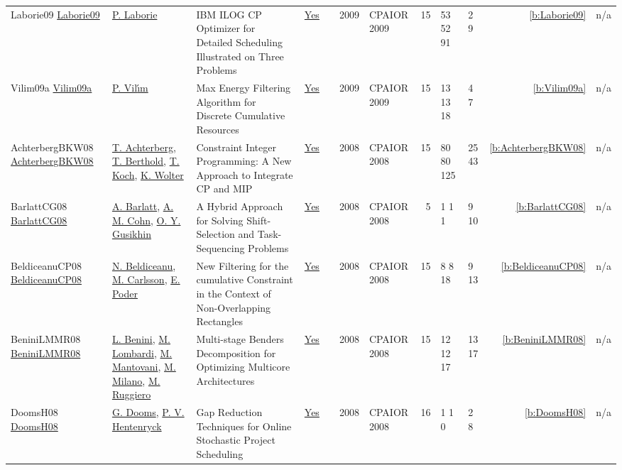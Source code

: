 {\begin{longtable}{>{\raggedright\arraybackslash}p{3cm}>{\raggedright\arraybackslash}p{4.5cm}>{\raggedright\arraybackslash}p{6.0cm}rrrp{2.5cm}rp{1cm}p{1cm}rr}
Laborie09 \href{https://doi.org/10.1007/978-3-642-01929-6_12}{Laborie09} & \hyperref[auth:a118]{P. Laborie} & {IBM} {ILOG} {CP} Optimizer for Detailed Scheduling Illustrated on Three Problems & \href{../works/Laborie09.pdf}{Yes} & \cite{Laborie09} & 2009 & CPAIOR 2009 & 15 & 53 52 91 & 2 9 & \ref{b:Laborie09} & n/a\\
Vilim09a \href{https://doi.org/10.1007/978-3-642-01929-6_22}{Vilim09a} & \hyperref[auth:a121]{P. Vil{\'{\i}}m} & Max Energy Filtering Algorithm for Discrete Cumulative Resources & \href{../works/Vilim09a.pdf}{Yes} & \cite{Vilim09a} & 2009 & CPAIOR 2009 & 15 & 13 13 18 & 4 7 & \ref{b:Vilim09a} & n/a\\
AchterbergBKW08 \href{https://doi.org/10.1007/978-3-540-68155-7_4}{AchterbergBKW08} & \hyperref[auth:a1045]{T. Achterberg}, \hyperref[auth:a351]{T. Berthold}, \hyperref[auth:a1168]{T. Koch}, \hyperref[auth:a1169]{K. Wolter} & Constraint Integer Programming: {A} New Approach to Integrate {CP} and {MIP} & \href{../works/AchterbergBKW08.pdf}{Yes} & \cite{AchterbergBKW08} & 2008 & CPAIOR 2008 & 15 & 80 80 125 & 25 43 & \ref{b:AchterbergBKW08} & n/a\\
BarlattCG08 \href{https://doi.org/10.1007/978-3-540-68155-7_24}{BarlattCG08} & \hyperref[auth:a361]{A. Barlatt}, \hyperref[auth:a362]{A. M. Cohn}, \hyperref[auth:a363]{O. Y. Gusikhin} & A Hybrid Approach for Solving Shift-Selection and Task-Sequencing Problems & \href{../works/BarlattCG08.pdf}{Yes} & \cite{BarlattCG08} & 2008 & CPAIOR 2008 & 5 & 1 1 1 & 9 10 & \ref{b:BarlattCG08} & n/a\\
BeldiceanuCP08 \href{https://doi.org/10.1007/978-3-540-68155-7_5}{BeldiceanuCP08} & \hyperref[auth:a128]{N. Beldiceanu}, \hyperref[auth:a91]{M. Carlsson}, \hyperref[auth:a358]{E. Poder} & New Filtering for the cumulative Constraint in the Context of Non-Overlapping Rectangles & \href{../works/BeldiceanuCP08.pdf}{Yes} & \cite{BeldiceanuCP08} & 2008 & CPAIOR 2008 & 15 & 8 8 18 & 9 13 & \ref{b:BeldiceanuCP08} & n/a\\
BeniniLMMR08 \href{https://doi.org/10.1007/978-3-540-68155-7_6}{BeniniLMMR08} & \hyperref[auth:a245]{L. Benini}, \hyperref[auth:a142]{M. Lombardi}, \hyperref[auth:a1153]{M. Mantovani}, \hyperref[auth:a143]{M. Milano}, \hyperref[auth:a718]{M. Ruggiero} & Multi-stage Benders Decomposition for Optimizing Multicore Architectures & \href{../works/BeniniLMMR08.pdf}{Yes} & \cite{BeniniLMMR08} & 2008 & CPAIOR 2008 & 15 & 12 12 17 & 13 17 & \ref{b:BeniniLMMR08} & n/a\\
DoomsH08 \href{https://doi.org/10.1007/978-3-540-68155-7_8}{DoomsH08} & \hyperref[auth:a359]{G. Dooms}, \hyperref[auth:a148]{P. V. Hentenryck} & Gap Reduction Techniques for Online Stochastic Project Scheduling & \href{../works/DoomsH08.pdf}{Yes} & \cite{DoomsH08} & 2008 & CPAIOR 2008 & 16 & 1 1 0 & 2 8 & \ref{b:DoomsH08} & n/a\\

\end{longtable}}
